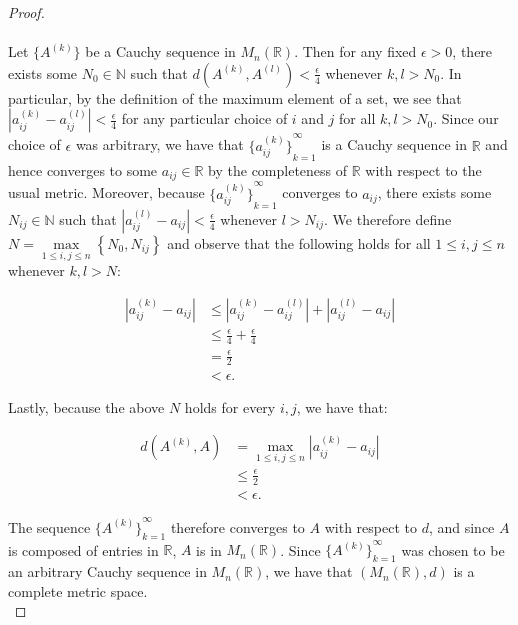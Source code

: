     \begin{proof}\ \\\\
        Let $\{A^{(k)}\}$ be a Cauchy sequence in $M_n(\mathbb{R})$. Then for any fixed $\epsilon > 0$, there exists
        some $N_0 \in \mathbb{N}$ such that $d(A^{(k)}, A^{(l)}) < \frac{\epsilon}{4}$ whenever $k,l > N_0$. In 
        particular, by the definition of the maximum element of a set, we see that 
        $|a_{ij}^{(k)} - a_{ij}^{(l)}| < \frac{\epsilon}{4}$ for any particular choice of $i$ and $j$ for all 
        $k,l > N_0$. Since our choice of $\epsilon$ was arbitrary, we have that ${\{a_{ij}^{(k)}\}}_{k=1}^{\infty}$ is a
        Cauchy sequence in $\mathbb{R}$ and hence converges to some $a_{ij} \in \mathbb{R}$ by the completeness of 
        $\mathbb{R}$ with respect to the usual metric. Moreover, because ${\{a_{ij}^{(k)}\}}_{k=1}^{\infty}$ converges 
        to $a_{ij}$, there exists some $N_{ij} \in \mathbb{N}$ such that $|a_{ij}^{(l)} - a_{ij}| < \frac{\epsilon}{4}$ 
        whenever $l > N_{ij}$. We therefore define $N = \max\limits_{1 \le i, j \le n}{\left\{N_0, N_{ij}\right\}}$ and
        observe that the following holds for all $1 \le i, j \le n$ whenever $k, l > N$:

        \begin{align*}
            |a_{ij}^{(k)} - a_{ij}| &\le |a_{ij}^{(k)} - a_{ij}^{(l)}| + |a_{ij}^{(l)} - a_{ij}| \\
                                    &\le \frac{\epsilon}{4} + \frac{\epsilon}{4} \\
                                    &= \frac{\epsilon}{2} \\
                                    &< \epsilon.
        \end{align*}

        Lastly, because the above $N$ holds for every $i, j$, we have that:
        
        \begin{align*}
            d(A^{(k)}, A) &= \max\limits_{1 \le i,j \le n}{|a_{ij}^{(k)} - a_{ij}|} \\
                          &\le \frac{\epsilon}{2} \\
                          &< \epsilon.
        \end{align*}

        The sequence ${\{A^{(k)}\}}_{k=1}^{\infty}$ therefore converges to $A$ with respect to $d$, and since $A$
        is composed of entries in $\mathbb{R}$, $A$ is in $M_n(\mathbb{R})$. Since ${\{A^{(k)}\}}_{k=1}^{\infty}$ was 
        chosen to be an arbitrary Cauchy sequence in $M_n(\mathbb{R})$, we have that $(M_n(\mathbb{R}), d)$ is a 
        complete metric space.
        \ \\
    \end{proof}

    \pagebreak